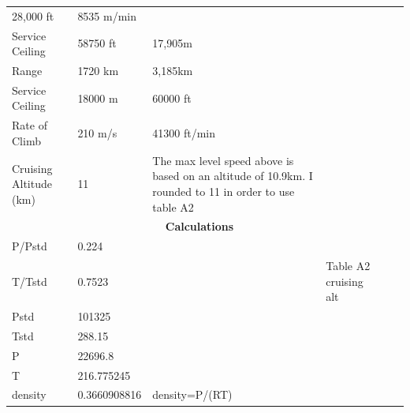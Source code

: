 \documentclass[12pt]{report}
\begin{document}
\begin{table}[H]
{\begin{tabular}{|lllll|l}
  \multicolumn{1}{l|}{28,000 ft} &
  \multicolumn{1}{l|}{8535 m/min} &
  \multicolumn{1}{l|}{} &
   &
   \\ \cline{1-5}
\multicolumn{1}{|l|}{Service Ceiling} &
  \multicolumn{1}{l|}{58750 ft} &
  \multicolumn{1}{l|}{17,905m} &
  \multicolumn{1}{l|}{} &
   &
   \\ \cline{1-5}
\multicolumn{1}{|l|}{Range} &
  \multicolumn{1}{l|}{1720 km} &
  \multicolumn{1}{l|}{3,185km} &
  \multicolumn{1}{l|}{} &
   &
   \\ \cline{1-5}
\multicolumn{1}{|l|}{Service Ceiling} &
  \multicolumn{1}{l|}{18000 m} &
  \multicolumn{1}{l|}{60000 ft} &
  \multicolumn{1}{l|}{} &
   &
   \\ \cline{1-5}
\multicolumn{1}{|l|}{Rate of Climb} &
  \multicolumn{1}{l|}{210 m/s} &
  \multicolumn{1}{l|}{41300 ft/min} &
  \multicolumn{1}{l|}{} &
   &
   \\ \cline{1-5}
\multicolumn{1}{|l|}{Cruising Altitude (km)} &
  \multicolumn{1}{l|}{11} &
  \multicolumn{1}{l|}{The max level speed above is based on an altitude of 10.9km. I rounded to 11 in order to use table A2} &
  \multicolumn{1}{l|}{} &
   &
   \\ \cline{1-5}
\multicolumn{5}{|c|}{\cellcolor[HTML]{9B9B9B}\textbf{Calculations}} &
   \\ \cline{1-5}
\multicolumn{1}{|l|}{P/Pstd} &
  \multicolumn{1}{l|}{0.224} &
  \multicolumn{1}{l|}{} &
  \multicolumn{1}{l|}{} &
   &
   \\ \cline{1-5}
\multicolumn{1}{|l|}{T/Tstd} &
  \multicolumn{1}{l|}{0.7523} &
  \multicolumn{1}{l|}{} &
  \multicolumn{1}{l|}{Table A2 cruising alt} &
   &
   \\ \cline{1-5}
\multicolumn{1}{|l|}{Pstd} &
  \multicolumn{1}{l|}{101325} &
  \multicolumn{1}{l|}{} &
  \multicolumn{1}{l|}{} &
   &
   \\ \cline{1-5}
\multicolumn{1}{|l|}{Tstd} &
  \multicolumn{1}{l|}{288.15} &
  \multicolumn{1}{l|}{} &
  \multicolumn{1}{l|}{} &
   &
   \\ \cline{1-5}
\multicolumn{1}{|l|}{P} &
  \multicolumn{1}{l|}{22696.8} &
  \multicolumn{1}{l|}{} &
  \multicolumn{1}{l|}{} &
   &
   \\ \cline{1-5}
\multicolumn{1}{|l|}{T} &
  \multicolumn{1}{l|}{216.775245} &
  \multicolumn{1}{l|}{} &
  \multicolumn{1}{l|}{} &
   &
   \\ \cline{1-5}
\multicolumn{1}{|l|}{density} &
  \multicolumn{1}{l|}{0.3660908816} &
  \multicolumn{1}{l|}{density=P/(RT)} &
  \multicolumn{1}{l|}{} &
   &
   \\ \cline{1-5}

\end{tabular}}
\end{table}
\end{document}
